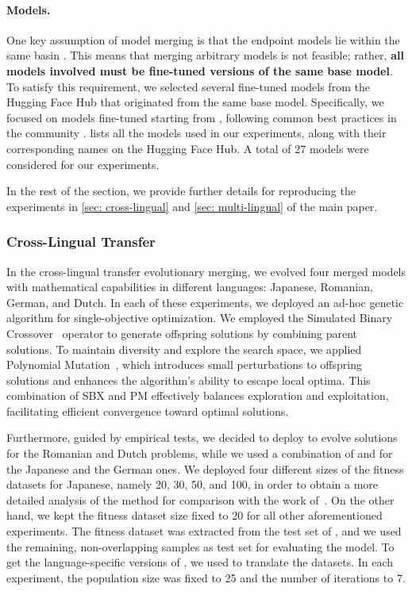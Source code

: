 \paragraph{Models.}
One key assumption of model merging is that the endpoint models lie within the same basin \cite{task-vectors}. This means that merging arbitrary models is not feasible; rather, \textbf{all models involved must be fine-tuned versions of the same base model}. To satisfy this requirement, we selected several fine-tuned models from the Hugging Face Hub that originated from the same base model. Specifically, we focused on models fine-tuned starting from  \cite{mistral}, following common best practices in the community \cite{sakana}.
 lists all the models used in our experiments, along with their corresponding names on the Hugging Face Hub. A total of $27$ models were considered for our experiments.

In the rest of the section, we provide further details for reproducing the experiments in \cref{sec: cross-lingual} and \cref{sec: multi-lingual} of the main paper.

\subsubsection{Cross-Lingual Transfer}

In the cross-lingual transfer evolutionary merging, we evolved four merged models with mathematical capabilities in different languages: Japanese, Romanian, German, and Dutch. In each of these experiments, we deployed an ad-hoc genetic algorithm for single-objective optimization. We employed the Simulated Binary Crossover~\cite{10.1145/1276958.1277190} operator to generate offspring solutions by combining parent solutions. To maintain diversity and explore the search space, we applied Polynomial Mutation~\cite{10.1145/1276958.1277190}, which introduces small perturbations to offspring solutions and enhances the algorithm's ability to escape local optima. This combination of SBX and PM effectively balances exploration and exploitation, facilitating efficient convergence toward optimal solutions.

Furthermore, guided by empirical tests, we decided to deploy  to evolve solutions for the Romanian and Dutch problems, while we used a combination of  and  for the Japanese and the German ones. We deployed four different sizes of the fitness datasets for Japanese, namely 20, 30, 50, and 100, in order to obtain a more detailed analysis of the method for comparison with the work of~\cite{sakana}. On the other hand, we kept the fitness dataset size fixed to 20 for all other aforementioned experiments. The fitness dataset was extracted from the test set of , and we used the remaining, non-overlapping samples as test set for evaluating the model. To get the language-specific versions of , we used  \cite{alves2024tower} to translate the datasets. In each experiment, the population size was fixed to 25 and the number of iterations to 7.

